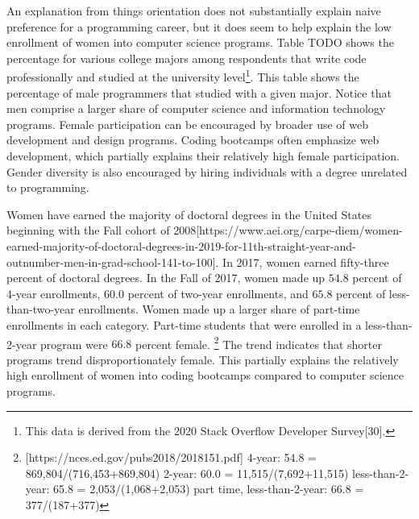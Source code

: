 \documentclass[review]{elsarticle}
\begin{document}
An explanation from things orientation does not substantially explain
naive preference for a programming career,
but it does seem to help explain the low enrollment of women into computer science programs.
Table TODO shows the percentage for various college majors among respondents that write code professionally and studied at the university level\footnote{
    This data is derived from the 2020 Stack Overflow Developer Survey[30].
}.
This table shows the percentage of male programmers that studied with a given major.
Notice that men comprise a larger share of computer science and information technology programs.
Female participation can be encouraged by broader use of web development and design programs.
Coding bootcamps often emphasize web development, which partially explains their relatively high female participation.
Gender diversity is also encouraged by hiring individuals with a degree unrelated to programming.

Women have earned the majority of doctoral degrees in the United States
beginning with the Fall cohort of 2008[https://www.aei.org/carpe-diem/women-earned-majority-of-doctoral-degrees-in-2019-for-11th-straight-year-and-outnumber-men-in-grad-school-141-to-100].
In 2017, women earned fifty-three percent of doctoral degrees.
In the Fall of 2017, women made up $54.8$ percent of 4-year enrollments,
$60.0$ percent of two-year enrollments,
and $65.8$ percent of less-than-two-year enrollments.
Women made up a larger share of part-time enrollments in each category.
Part-time students that were enrolled in a less-than-2-year program
were $66.8$ percent female.
\footnote{
    [https://nces.ed.gov/pubs2018/2018151.pdf]
    4-year: 54.8 = 869,804/(716,453+869,804)
    2-year: 60.0 = 11,515/(7,692+11,515)
    less-than-2-year: 65.8 = 2,053/(1,068+2,053)
    part time, less-than-2-year: 66.8 = 377/(187+377)
}
The trend indicates that shorter programs trend disproportionately female.
This partially explains the relatively high enrollment of women into
coding bootcamps compared to computer science programs.

\end{document}
